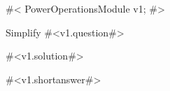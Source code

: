 

#<
PowerOperationsModule v1;
#>


Simplify #<v1.question#>



#<v1.solution#>



#<v1.shortanswer#>



